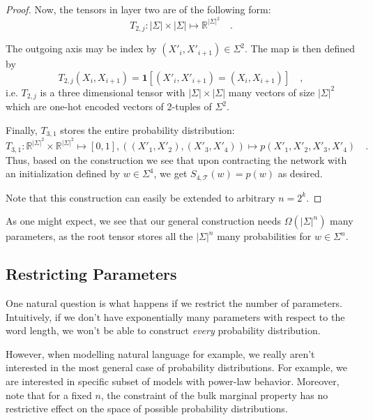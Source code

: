 \documentclass[../../main.tex]{subfiles}
\begin{document}
\begin{proof}
    Now, the tensors in layer two are of the following form:
    \[
    T_{2, j}: |\Sigma| \times |\Sigma| \mapsto \mathbb{R}^{|\Sigma|^2} \quad .
    \]

    \pagebreak
    
    The outgoing axis may be index by $(X'_i, X'_{i + 1}) \in \Sigma^2$. The map is then defined by
    \[
        T_{2, j}(X_i, X_{i + 1}) = \bm{1}[(X'_i, X'_{i + 1}) = (X_i, X_{i + 1})] \quad ,
    \]
    i.e. $T_{2, j}$ is a three dimensional tensor with $|\Sigma| \times |\Sigma|$ many vectors of size $|\Sigma|^2$ which are one-hot encoded vectors of 2-tuples of $\Sigma^2$.

    Finally, $T_{3, 1}$ stores the entire probability distribution:
    \[
        T_{3, 1}: \mathbb{R}^{|\Sigma|^2} \times \mathbb{R}^{|\Sigma|^2} \mapsto [0, 1], ((X'_1, X'_2), (X'_3, X'_4)) \mapsto p(X'_1, X'_2, X'_3, X'_4) \quad .
    \]
    Thus, based on the construction we see that upon contracting the network with an initialization defined by $w \in \Sigma^4$, we get $S_{4, \mathcal{T}}(w) = p(w)$ as desired.

    Note that this construction can easily be extended to arbitrary $n = 2^k$.
    \end{proof}

    As one might expect, we see that our general construction needs $\Omega(|\Sigma|^n)$ many parameters, as the root tensor stores all the $|\Sigma|^n$ many probabilities for $w \in \Sigma^n$.

\subsection{Restricting Parameters}
    One natural question is what happens if we restrict the number of parameters. Intuitively, if we don't have exponentially many parameters with respect to the word length, we won't be able to construct \emph{every} probability distribution.

    However, when modelling natural language for example, we really aren't interested in the most general case of probability distributions.
    For example, we are interested in specific subset of models with power-law behavior.
    Moreover, note that for a fixed $n$, the constraint of the bulk marginal property has no restrictive effect on the space of possible probability distributions.
\end{document}

